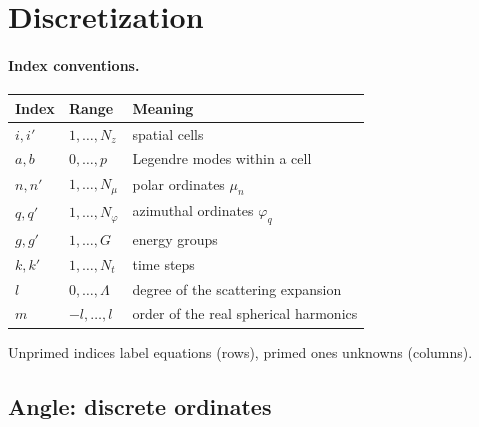 \documentclass[11pt,a4paper]{article}
\numberwithin{equation}{section}
\theoremstyle{remark}
\newcommand{\Lmax}{\Lambda}
\begin{document}
\section{Discretization}
\label{sec:discr}

\paragraph{Index conventions.}
\begin{center}
\begin{tabular}{@{}lll@{}}
\toprule
Index & Range & Meaning \\
\midrule
$i,i'$ & $1,\dots,N_z$ & spatial cells \\
$a,b$ & $0,\dots,p$ & Legendre modes within a cell \\
$n,n'$ & $1,\dots,N_\mu$ & polar ordinates $\mu_n$ \\
$q,q'$ & $1,\dots,N_\varphi$ & azimuthal ordinates $\varphi_q$ \\
$g,g'$ & $1,\dots,G$ & energy groups \\
$k,k'$ & $1,\dots,N_t$ & time steps \\
$l$ & $0,\dots,\Lmax$ & degree of the scattering expansion \\
$m$ & $-l,\dots,l$ & order of the real spherical harmonics \\
\bottomrule
\end{tabular}
\end{center}
Unprimed indices label equations (rows), primed ones unknowns (columns).

\subsection{Angle: discrete ordinates}
\label{sec:angle}
\end{document}
